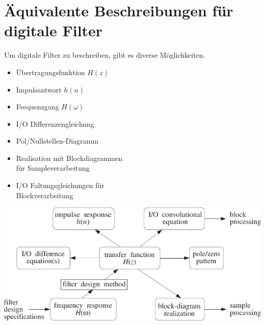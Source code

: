 % 
% 
% 
% 
%

\section{Äquivalente Beschreibungen für digitale Filter}
	Um digitale Filter zu beschreiben, gibt es diverse Möglichkeiten.\\[0.2cm]
	\begin{minipage}{0.4\textwidth}
		\begin{itemize}
		 \item Übertragungsfunktion $H(z)$\\[-0.3cm]
		 \item Impulsantwort $h(n)$\\[-0.3cm]
		 \item Frequenzgang $H(\omega)$\\[-0.3cm]
		 \item I/O Differenzengleichung\\[-0.3cm]
		 \item Pol/Nullstellen-Diagramm\\[-0.3cm]
		 \item Realisation mit Blockdiagrammen\\ für Sampleverarbeitung\\[-0.3cm]
		 \item I/O Faltungsgleichungen für\\ Blockverarbeitung
		\end{itemize}
	\end{minipage}
	\begin{minipage}{0.6\textwidth}
		\includegraphics[width = 1\textwidth]{pic/transFunc.pdf}	
	\end{minipage}\\[0.3cm]

